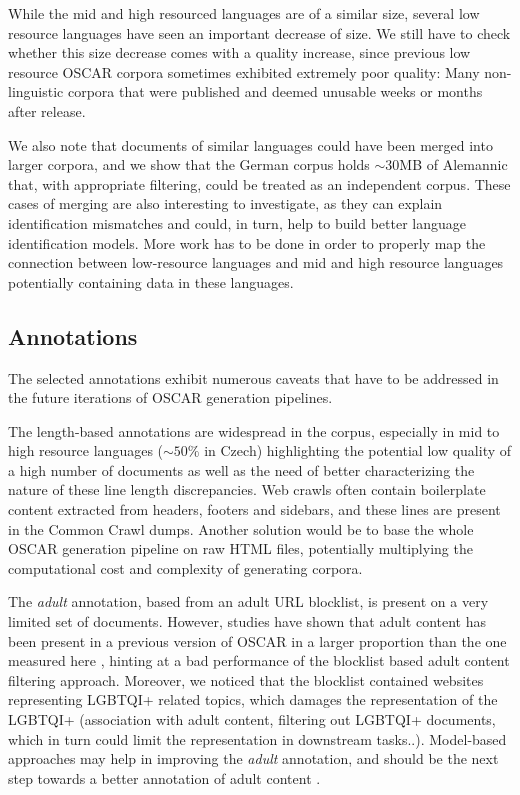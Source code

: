 While the mid and high resourced languages are of a similar size, several low resource languages have seen an important decrease of size.
We still have to check whether this size decrease comes with a quality increase, since previous low resource OSCAR corpora sometimes exhibited extremely poor quality: Many non-linguistic corpora that were published and deemed unusable weeks or months after release.

We also note that documents of similar languages could have been merged into larger corpora, and we show that the German corpus holds $\sim 30$MB of Alemannic that, with appropriate filtering, could be treated as an independent corpus. These cases of merging are also interesting to investigate, as they can explain identification mismatches and could, in turn, help to build better language identification models.
More work has to be done in order to properly map the connection between low-resource languages and mid and high resource languages potentially containing data in these languages.

\subsection{Annotations}

The selected annotations exhibit numerous caveats that have to be addressed in the future iterations of OSCAR generation pipelines.

The length-based annotations are widespread in the corpus, especially in mid to high resource languages ($\sim50\%$ in Czech) highlighting the potential low quality of a high number of documents as well as the need of better characterizing the nature of these line length discrepancies. Web crawls often contain boilerplate content extracted from headers, footers and sidebars, and these lines are present in the Common Crawl dumps.
Another solution would be to base the whole OSCAR generation pipeline on raw HTML files, potentially multiplying the computational cost and complexity of generating corpora.

The \textit{adult} annotation, based from an adult URL blocklist, is present on a very limited set of documents. However, studies have shown that adult content has been present in a previous version of OSCAR in a larger proportion than the one measured here \cite{caswell-etal-2021-quality}, hinting at a bad performance of the blocklist based adult content filtering approach. Moreover, we noticed that the blocklist contained websites representing LGBTQI+ related topics, which damages the representation of the LGBTQI+ (association with adult content, filtering out LGBTQI+ documents, which in turn could limit the representation in downstream tasks..).
Model-based approaches may help in improving the \textit{adult} annotation, and should be the next step towards a better annotation of adult content \cite{luccioni-viviano-2021-whats}.

